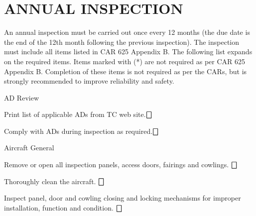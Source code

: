 \section{ANNUAL INSPECTION} An annual inspection must be carried out once every 12 months (the due date is the end of the 12th month following the previous inspection). The inspection must include all items listed in CAR 625 Appendix B. The following list expands on the required items. Items marked with (*) are not required as per CAR 625 Appendix B. Completion of these items is not required as per the CARs, but is strongly recommended to improve reliability and safety.

\begin{enumerate*}
	\item{AD Review}
	\begin{enumerate*}
		\item Print list of applicable ADs from TC web site.\dotfill $\bigbox$
		\item Comply with ADs during inspection as required.\dotfill $\bigbox$
	\end{enumerate*}

  \item{Aircraft General}
  \begin{enumerate*}
    \item Remove or open all inspection panels, access doors, fairings and cowlings. \dotfill $\bigbox$
    \item Thoroughly clean the aircraft. \dotfill $\bigbox$
    \item Inspect panel, door and cowling closing and locking mechanisms for improper installation, function and condition. \dotfill $\bigbox$
		\end{enumerate*}


\end{enumerate*}

